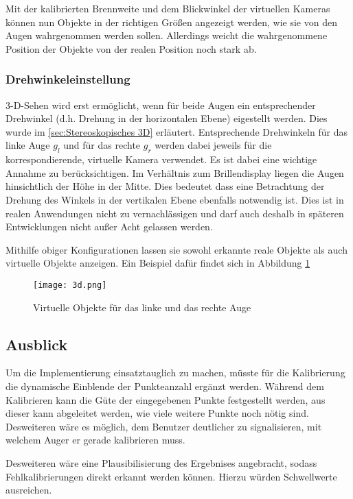 %
Mit der kalibrierten Brennweite und dem Blickwinkel der virtuellen Kameras können nun Objekte in der richtigen Größen angezeigt werden, wie sie von den Augen wahrgenommen werden sollen. Allerdings weicht die wahrgenommene Position der Objekte von der realen Position noch stark ab. 

\subsubsection{Drehwinkeleinstellung}
3-D-Sehen wird erst ermöglicht, wenn für beide Augen ein entsprechender Drehwinkel (d.h. Drehung in der horizontalen Ebene) eigestellt werden. Dies wurde im \ref{sec:Stereoskopisches 3D} erläutert.  Entsprechende Drehwinkeln für das linke Auge $g_{l}$ und für das rechte $g_{r}$ werden dabei jeweils für die korrespondierende, virtuelle Kamera verwendet.
Es ist dabei eine wichtige Annahme zu berücksichtigen. Im Verhältnis zum Brillendisplay liegen die Augen hinsichtlich der Höhe in der Mitte. Dies bedeutet dass eine Betrachtung der Drehung des Winkels in der vertikalen Ebene ebenfalls notwendig ist. Dies ist in realen Anwendungen nicht zu vernachlässigen und darf auch deshalb in späteren Entwicklungen nicht außer Acht gelassen werden.

Mithilfe obiger Konfigurationen lassen sie sowohl erkannte reale Objekte als auch virtuelle Objekte anzeigen.  Ein Beispiel dafür findet sich in Abbildung \ref{fig:Virtuelle Quadrate aus Prezi}

\begin{figure}[h]
   \centering
   \texttt{[image: 3d.png]}
   \caption{Virtuelle Objekte für das linke und das rechte Auge}
   \label{fig:Virtuelle Quadrate aus Prezi}
\end{figure}

\subsection{Ausblick}
Um die Implementierung einsatztauglich zu machen, müsste für die Kalibrierung die dynamische Einblende der Punkteanzahl ergänzt werden. Während dem Kalibrieren kann die Güte der eingegebenen Punkte festgestellt werden, aus dieser kann abgeleitet werden, wie viele weitere Punkte noch nötig sind. Desweiteren wäre es möglich, dem Benutzer deutlicher zu signalisieren, mit welchem Auger er gerade kalibrieren muss.

Desweiteren wäre eine Plausibilisierung des Ergebnises angebracht, sodass Fehlkalibrierungen direkt erkannt werden können. Hierzu würden Schwellwerte ausreichen.

